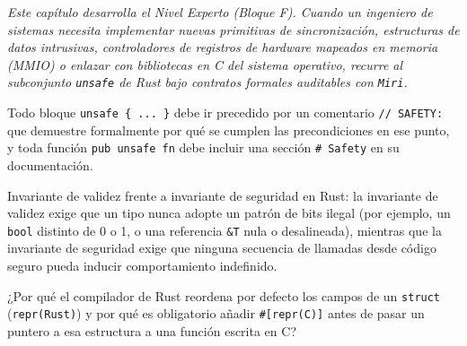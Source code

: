 \documentclass{book}
\begin{document}
\noindent\textit{Este capítulo desarrolla el Nivel Experto (Bloque F). Cuando un ingeniero de sistemas necesita implementar nuevas primitivas de sincronización, estructuras de datos intrusivas, controladores de registros de hardware mapeados en memoria (MMIO) o enlazar con bibliotecas en C del sistema operativo, recurre al subconjunto \texttt{unsafe} de Rust bajo contratos formales auditables con \texttt{Miri}.}

\begin{tcolorbox}[title={Consejo}, studiumtip, breakable]

Todo bloque \texttt{unsafe \{ ... \}} debe ir precedido por un comentario \texttt{// SAFETY:} que demuestre formalmente por qué se cumplen las precondiciones en ese punto, y toda función \texttt{pub unsafe fn} debe incluir una sección \texttt{\# Safety} en su documentación.
\end{tcolorbox}

\begin{tcolorbox}[title={Definición}, studiumdef, breakable]

Invariante de validez frente a invariante de seguridad en Rust: la invariante de validez exige que un tipo nunca adopte un patrón de bits ilegal (por ejemplo, un \texttt{bool} distinto de 0 o 1, o una referencia \texttt{\&T} nula o desalineada), mientras que la invariante de seguridad exige que ninguna secuencia de llamadas desde código seguro pueda inducir comportamiento indefinido.
\end{tcolorbox}

\begin{tcolorbox}[title={Autoficha}, studiumcheck, breakable]

¿Por qué el compilador de Rust reordena por defecto los campos de un \texttt{struct} (\texttt{repr(Rust)}) y por qué es obligatorio añadir \texttt{\#[repr(C)]} antes de pasar un puntero a esa estructura a una función escrita en C?
\end{tcolorbox}
\end{document}
